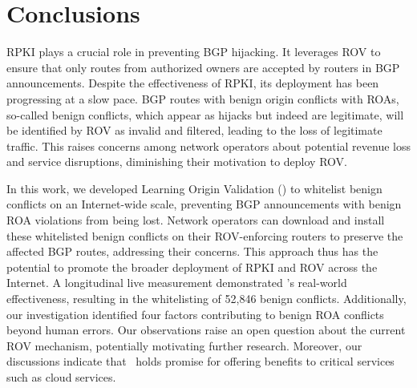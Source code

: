 
\section{Conclusions} \label{sec:conclusion}
RPKI plays a crucial role in preventing BGP hijacking. It leverages ROV to ensure that only routes from authorized owners are accepted by routers in BGP announcements.
Despite the effectiveness of RPKI, its deployment has been progressing at a slow pace.
BGP routes with benign origin conflicts with ROAs, so-called benign conflicts, which appear as hijacks but indeed are legitimate, will be identified by ROV as invalid and filtered, leading to the loss of legitimate traffic. This raises concerns among network operators about potential revenue loss and service disruptions, diminishing their motivation to deploy ROV.

In this work, we developed Learning Origin Validation (\lov) to whitelist benign conflicts on an Internet-wide scale, preventing BGP announcements with benign ROA violations from being lost. Network operators can download and install these whitelisted benign conflicts on their ROV-enforcing routers to preserve the affected BGP routes, addressing their concerns. This approach thus has the potential to promote the broader deployment of RPKI and ROV across the Internet.
A longitudinal live measurement demonstrated \lov’s real-world effectiveness, resulting in the whitelisting of 52,846 benign conflicts. Additionally, our investigation identified four factors contributing to benign ROA conflicts beyond human errors. Our observations raise an open question about the current ROV mechanism, potentially motivating further research. Moreover, our discussions indicate that \lov\ holds promise for offering benefits to critical services such as cloud services.




